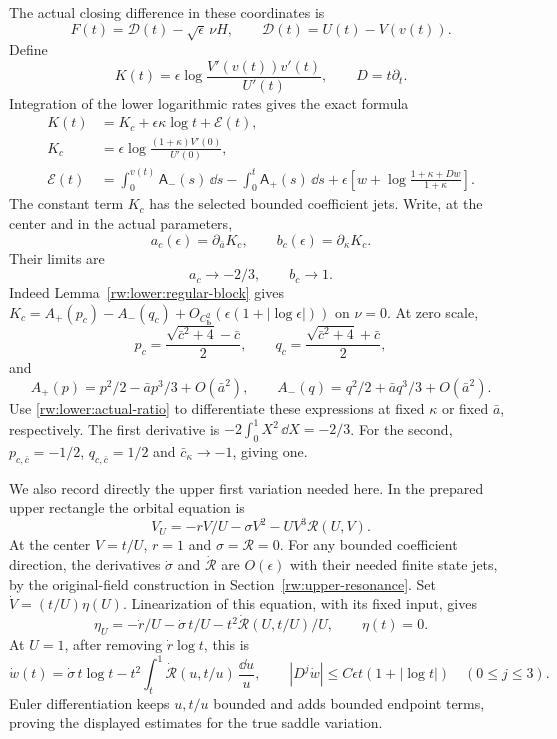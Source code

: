 The actual closing difference in these coordinates is
\begin{equation}\label{rw:lower:closing}
 F(t)=\mathscr D(t)-\sqrt\epsilon\,\nu H,\qquad
 \mathscr D(t)=U(t)-V(v(t)).
\end{equation}
Define
\[
 K(t)=\epsilon\log\frac{V'(v(t))v'(t)}{U'(t)},\qquad D=t\partial_t.
\]
Integration of the lower logarithmic rates gives the exact formula
\begin{equation}\label{rw:lower:exact-logarithm}
\begin{aligned}
 K(t)&=K_c+\epsilon\kappa\log t+\mathcal E(t),\\
 K_c&=\epsilon\log\frac{(1+\kappa)V'(0)}{U'(0)},\\
 \mathcal E(t)&=\int_0^{v(t)}\mathsf A_-(s)\,\dd s
       -\int_0^t\mathsf A_+(s)\,\dd s
       +\epsilon\left[w+\log\frac{1+\kappa+Dw}{1+\kappa}\right].
\end{aligned}
\end{equation}
The constant term $K_c$ has the selected bounded coefficient jets.
Write, at the center and in the actual parameters,
\[
 a_c(\epsilon)=\partial_{\bar a}K_c,\qquad
 b_c(\epsilon)=\partial_\kappa K_c.
\]
Their limits are
\begin{equation}\label{rw:lower:constant-columns}
 a_c\longrightarrow-2/3,\qquad b_c\longrightarrow1.
\end{equation}
Indeed Lemma~\ref{rw:lower:regular-block} gives
$K_c=A_+(p_c)-A_-(q_c)+O_{C_{\mathbf b}^2}
(\epsilon(1+|\log\epsilon|))$ on $\nu=0$.
At zero scale,
\[
 p_c=\frac{\sqrt{\bar c^2+4}-\bar c}{2},\qquad
 q_c=\frac{\sqrt{\bar c^2+4}+\bar c}{2},
\]
and
\[
 A_+(p)=p^2/2-\bar ap^3/3+O(\bar a^2),\qquad
 A_-(q)=q^2/2+\bar aq^3/3+O(\bar a^2).
\]
Use \eqref{rw:lower:actual-ratio} to differentiate these expressions
at fixed $\kappa$ or fixed $\bar a$, respectively.
The first derivative is $-2\int_0^1X^2\,\dd X=-2/3$.
For the second,
$p_{c,\bar c}=-1/2$, $q_{c,\bar c}=1/2$ and
$\bar c_\kappa\to-1$, giving one.

We also record directly the upper first variation needed here.
In the prepared upper rectangle the orbital equation is
\[
 V_U=-rV/U-\sigma V^2-UV^3\mathcal R(U,V).
\]
At the center $V=t/U$, $r=1$ and $\sigma=\mathcal R=0$.
For any bounded coefficient direction, the derivatives
$\dot\sigma$ and $\dot{\mathcal R}$ are $O(\epsilon)$ with their
needed finite state jets, by the original-field construction in
Section~\ref{rw:upper-resonance}. Set $\dot V=(t/U)\eta(U)$.
Linearization of this equation, with its fixed input, gives
\[
 \eta_U=-\dot r/U-\dot\sigma\,t/U
                     -t^2\dot{\mathcal R}(U,t/U)/U,\qquad \eta(t)=0.
\]
At $U=1$, after removing $\dot r\log t$, this is
\begin{equation}\label{rw:lower:upper-linearization}
 \dot w(t)=\dot\sigma\,t\log t
     -t^2\int_t^1\dot{\mathcal R}(u,t/u)\,\frac{\dd u}{u},
 \qquad |D^j\dot w|\le C\epsilon t(1+|\log t|)\quad(0\le j\le3).
\end{equation}
Euler differentiation keeps $u,t/u$ bounded and adds bounded endpoint
terms, proving the displayed estimates for the true saddle variation.

